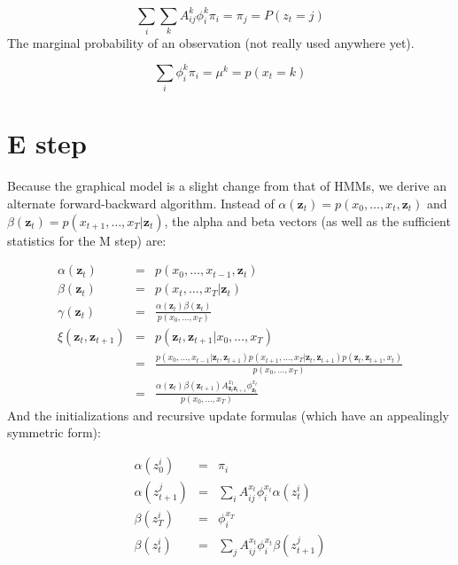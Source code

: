 \documentclass[11pt]{article}
\begin{document}
\[
\sum_i \sum_k A^k_{ij} \phi^k_i \pi_i = \pi_j = P(z_t = j)
\]
The marginal probability of an observation (not really used anywhere yet).

\[
\sum_i \phi^k_i \pi_i = \mu^k = p(x_t = k)
\]

\section{E step}

Because the graphical model is a slight change from that of HMMs, we derive an alternate forward-backward algorithm.  Instead of $\alpha(\mathbf{z}_t) = p(x_0,\ldots,x_t,\mathbf{z}_t)$ and $\beta(\mathbf{z}_t) = p(x_{t+1},\ldots,x_T|\mathbf{z}_t)$, the alpha and beta vectors (as well as the sufficient statistics for the M step) are:

\begin{eqnarray*}
\alpha(\mathbf{z}_t) & = & p(x_0,\ldots,x_{t-1},\mathbf{z}_t) \\
\beta(\mathbf{z}_t) & = & p(x_t,\ldots,x_T|\mathbf{z}_t) \\
\gamma(\mathbf{z}_t) & = & \frac{\alpha(\mathbf{z}_t)\beta(\mathbf{z}_t)}{p(x_0,\ldots,x_T)} \\
\xi(\mathbf{z}_t,\mathbf{z}_{t+1}) & = & p(\mathbf{z}_t,\mathbf{z}_{t+1}|x_0,\ldots,x_T) \\
& = & \frac{p(x_0,\ldots,x_{t-1}|\mathbf{z}_{t},\mathbf{z}_{t+1})p(x_{t+1},\ldots,x_T|\mathbf{z}_{t},\mathbf{z}_{t+1})p(\mathbf{z}_t,\mathbf{z}_{t+1},x_t)}{p(x_0,\ldots,x_T)} \\
& = & \frac{\alpha(\mathbf{z}_t)\beta(\mathbf{z}_{t+1})A^{x_t}_{\mathbf{z}_t\mathbf{z}_{t+1}}\phi^{x_t}_{\mathbf{z}_t}}{p(x_0,\ldots,x_T)}
\end{eqnarray*}
And the initializations and recursive update formulas (which have an appealingly symmetric form):

\begin{eqnarray*}
\alpha(z_0^i) & = & \pi_i \\
\alpha(z_{t+1}^j) & = & \sum_i A^{x_t}_{ij}\phi^{x_t}_i\alpha(z_t^i) \\
\beta(z_T^i) & = & \phi^{x_T}_i \\
\beta(z_t^i) & = & \sum_j A^{x_t}_{ij}\phi^{x_t}_i \beta(z_{t+1}^j)
\end{eqnarray*}
\end{document}
